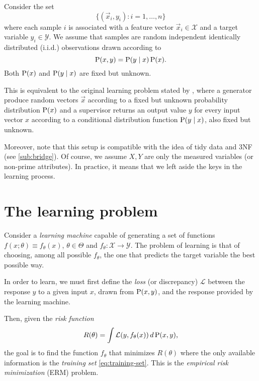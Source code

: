 Consider the set
\begin{equation}
  \label{eq:training-set}
  \big\{(\vec{x}_i, y_i) : i = 1, \dots, n \big\}
\end{equation}
where each sample $i$ is associated with a feature vector $\vec{x}_i \in \mathcal{X}$ and a target variable
$y_i \in \mathcal{Y}$.  We assume that samples are random independent identically
distributed (i.i.d.) observations drawn according to $$\operatorname{P}(x, y) = \operatorname{P}(y \mid x) \operatorname{P}(x)\text{.}$$
Both $\operatorname{P}(x)$ and $\operatorname{P}(y \mid x)$ are fixed but unknown.

This is equivalent to the original learning problem stated by \textcite{Vapnik1999b}, where
a generator produce random vectors $\vec{x}$ according to a fixed but unknown
probability distribution $\operatorname{P}(x)$ and a supervisor returns an output value $y$ for every
input vector $x$ according to a conditional distribution function $\operatorname{P}(y \mid x)$, also fixed but
unknown.

Moreover, note that this setup is compatible with the idea of tidy data and 3NF (see
\cref{sub:bridge}). Of course, we assume $X, Y$ are only the measured variables (or
non-prime attributes).  In practice, it means that we left aside the keys in the learning
process.

\section{The learning problem}

Consider a \emph{learning machine} capable of generating a set of functions $f(x;
\theta) \equiv f_\theta(x)$, $\theta \in \Theta$ and $f_\theta : \mathcal{X} \rightarrow \mathcal{Y}$.
The problem of learning is that of choosing, among all possible $f_\theta$, the one that
predicts the target variable the best possible way.

In order to learn, we must first define the \emph{loss} (or discrepancy) $\mathcal{L}$
between the response $y$ to a given input $x$, drawn from $\operatorname{P}(x, y)$, and the
response provided by the learning machine.

Then, given the \emph{risk function}
\begin{equation}
  \label{eq:risk}
  R(\theta) = \int \mathcal{L}(y, f_\theta(x))\, d\operatorname{P}(x, y)\text{,}
\end{equation}
the goal is to find the function $f_\theta$ that minimizes $R(\theta)$
where the only available information is the \emph{training set} \eqref{eq:training-set}.
This is the \emph{empirical risk minimization} (ERM) problem.

